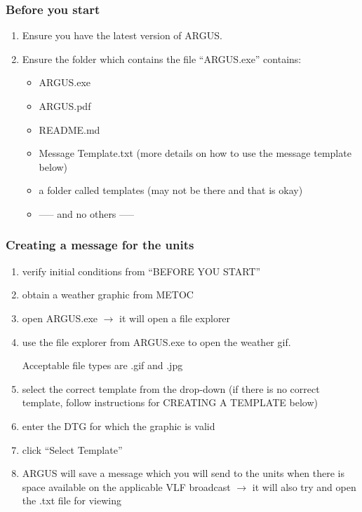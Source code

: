 \subsubsection{Before you start}
\begin{enumerate}
    \item Ensure you have the latest version of ARGUS.
    \item Ensure the folder which contains the file ``ARGUS.exe'' contains:
    \begin{itemize}
        \item ARGUS.exe
        \item ARGUS.pdf
        \item README.md
        \item Message Template.txt (more details on how to use the message template below)
        \item a folder called templates (may not be there and that is okay)
        \item ----- and no others -----
    \end{itemize}
\end{enumerate}

\subsubsection{Creating a message for the units}
\begin{enumerate}
    \item verify initial conditions from ``BEFORE YOU START''
    \item obtain a weather graphic from METOC
    \item open ARGUS.exe $\rightarrow$ it will open a file explorer
    \item use the file explorer from ARGUS.exe to open the weather gif.
    \begin{addnote} Acceptable file types are .gif and .jpg \end{addnote}
    \item select the correct template from the drop-down (if there is no correct template, follow instructions for CREATING A TEMPLATE below)
    \item enter the DTG for which the graphic is valid
    \item click ``Select Template''
    \item ARGUS will save a message which you will send to the units when there is space available on the applicable VLF broadcast $\rightarrow$ it will also try and open the .txt file for viewing
\end{enumerate}


